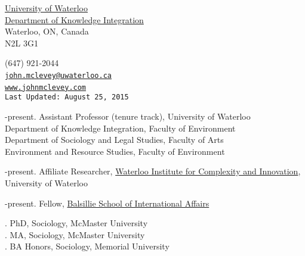 \documentclass[9pt,usenames,dvipsnames]{article}
\makeatletter
\def\myemail{john.mclevey@uwaterloo.ca}
\def\myweb{www.johnmclevey.com}
\def\myphone{(647) 921-2044}
\def\lastupdated{Last Updated: August 25, 2015}
\makeatother
\begin{document}
\begin{minipage}[t]{2.95in}
 \flushright \footnotesize \href{https://uwaterloo.ca/}{University of Waterloo} \\  \href{https://uwaterloo.ca/knowledge-integration/faculty-mclevey}{Department of Knowledge Integration} \\ Waterloo, ON, Canada \\ N2L 3G1\\
  \end{minipage}
\hfill
\hfill
\begin{minipage}[t]{1.7in}
  \flushright \footnotesize \myphone\, \faPhone \\
  {\texttt{\href{mailto:\myemail}{\myemail}} \, \faEnvelope} \\
  {\texttt{\href{\myweb}{\myweb}} \, \faGlobe} \\
  {\texttt{\lastupdated}}\\
\end{minipage}


\bigskip

\reversemarginpar

\bigskip
{}
\smallskip
{}-present. Assistant Professor (tenure track), University of Waterloo \\
\noindent Department of Knowledge Integration, Faculty of Environment \\
\noindent Department of Sociology and Legal Studies, Faculty of Arts \\
\noindent Environment and Resource Studies, Faculty of Environment \\

\smallskip
{}

-present. Affiliate Researcher, \href{http://wici.ca/new/}{Waterloo Institute for Complexity and Innovation}, University of Waterloo

-present. Fellow, \href{http://www.balsillieschool.ca/}{Balsillie School of International Affairs} \\

\smallskip
{}

. PhD, Sociology, McMaster University \\
. MA, Sociology, McMaster University \\
. BA Honors, Sociology, Memorial University \\
\end{document}
